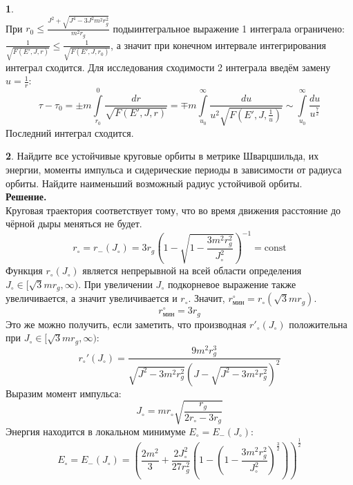 \documentclass[12pt]{article}
\theoremstyle{definition}
\newtheorem{zad}{}[section]
\begin{document}
\begin{zad}
\begin{equation}
\end{equation}
При $r_0\leq\frac{J^2+\sqrt{J^4-3J^2m^2r_g^2}}{m^2r_g}$ подыинтегральное выражение 1 интеграла ограничено: $\frac{1}{\sqrt{F(E',J,r)}}\leq \frac{1}{\sqrt{F(E',J,r_0)}}$, а значит при конечном интервале интегрирования интеграл сходится. Для исследования сходимости 2 интеграла введём замену $u=\frac{1}{r}$:
\begin{equation}
    \tau-\tau_0=\pm m\int\limits_{r_0}^0\frac{dr}{\sqrt{F(E',J,r)}}=\mp m\int\limits_{u_0}^\infty\frac{du}{u^2\sqrt{F(E',J,\frac{1}{u})}}\sim\int\limits_{u_0}^\infty\frac{du}{u^\frac{7}{2}}
\end{equation}
Последний интеграл сходится.
\end{zad}
\newpage
\begin{zad}
Найдите все устойчивые круговые орбиты в метрике Шварцшильда, их энергии, моменты импульса и сидерические периоды в зависимости от радиуса орбиты. Найдите наименьший возможный радиус устойчивой орбиты.\\
\textbf{Решение.}\\
Круговая траектория соответствует тому, что во время движения расстояние до чёрной дыры меняться не будет.
\begin{equation}
    r_\circ=r_-(J_\circ)=3r_g\left(1-\sqrt{1-\frac{3m^2r_g^2}{J_\circ^2}}\right)^{-1}=\text{const}
\end{equation}
Функция $r_\circ(J_\circ)$ является непрерывной на всей области определения $J_\circ\in[\sqrt{3}mr_g,\infty)$. При увеличении $J_\circ$ подкорневое выражение также увеличивается, а значит увеличивается и $r_\circ$. Значит, $r^\circ_{мин}=r_\circ(\sqrt{3}mr_g)$.
\begin{equation}
    \boxed{r^\circ_{мин}=3r_g}
\end{equation}
Это же можно получить, если заметить, что производная $r'_\circ(J_\circ)$ положительна при $J_\circ\in[\sqrt{3}mr_g,\infty)$:
\begin{equation}
    r_\circ'(J_\circ)=\frac{9m^2r_g^3}{\sqrt{J^2-3m^2r_g^2}(J-\sqrt{J^2-3m^2r_g^2})^2}
\end{equation}
Выразим момент импульса:
\begin{equation}
    \boxed{J_\circ=mr_\circ\sqrt{\frac{r_g}{2r_\circ-3r_g}}}
\end{equation}
Энергия находится в локальном минимуме $E_\circ=E_-(J_\circ)$:
\begin{equation}
    E_\circ=E_-(J_\circ)=\left(\frac{2m^2}{3}+\frac{2J_\circ^2}{27r_g^2}\left(1-\left(1-\frac{3m^2r_g^2}{J_\circ^2}\right)^\frac{3}{2}\right)\right)^\frac{1}{2}

\end{equation}
\end{zad}
\end{document}
